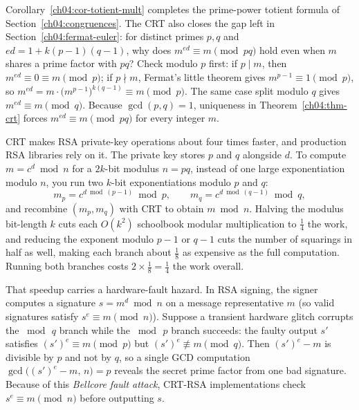 Corollary~\ref{ch04:cor-totient-mult} completes the prime-power totient formula of
Section~\ref{ch04:congruences}. The CRT also closes the gap left in Section~\ref{ch04:fermat-euler}:
for distinct primes $p, q$ and $ed = 1 + k(p-1)(q-1)$, why does $m^{ed} \equiv m \pmod{pq}$ hold even
when $m$ shares a prime factor with $pq$? Check modulo $p$ first: if $p \mid m$, then
$m^{ed} \equiv 0 \equiv m \pmod p$; if $p \nmid m$, Fermat's little theorem gives
$m^{p-1} \equiv 1 \pmod p$, so $m^{ed} = m \cdot \bigl(m^{p-1}\bigr)^{k(q-1)} \equiv m \pmod p$. The
same case split modulo $q$ gives $m^{ed} \equiv m \pmod q$. Because $\gcd(p, q) = 1$, uniqueness in
Theorem~\ref{ch04:thm-crt} forces $m^{ed} \equiv m \pmod{pq}$ for every integer $m$.

\begin{applicationbox}
CRT makes RSA private-key operations about four times faster, and production RSA libraries rely on
it. The private key stores $p$ and $q$ alongside $d$. To compute $m = c^d \bmod n$ for a $2k$-bit
modulus $n = pq$, instead of one large exponentiation modulo $n$, you run two $k$-bit
exponentiations modulo $p$ and $q$:
\[
  m_p = c^{d \bmod (p-1)} \bmod p, \qquad m_q = c^{d \bmod (q-1)} \bmod q,
\]
and recombine $(m_p, m_q)$ with CRT to obtain $m \bmod n$. Halving the modulus bit-length $k$ cuts
each $O(k^2)$ schoolbook modular multiplication to $\tfrac{1}{4}$ the work, and reducing the
exponent modulo $p - 1$ or $q - 1$ cuts the number of squarings in half as well, making each branch
about $\tfrac{1}{8}$ as expensive as the full computation. Running both branches costs
$2 \times \tfrac{1}{8} = \tfrac{1}{4}$ the work overall.

That speedup carries a hardware-fault hazard. In RSA signing, the signer computes a signature
$s = m^d \bmod n$ on a message representative $m$ (so valid signatures satisfy
$s^e \equiv m \pmod n$). Suppose a transient hardware glitch corrupts the $\bmod\,q$ branch while the
$\bmod\,p$ branch succeeds: the faulty output $s'$ satisfies $(s')^e \equiv m \pmod p$ but
$(s')^e \not\equiv m \pmod q$. Then $(s')^e - m$ is divisible by $p$ and not by $q$, so a single GCD
computation $\gcd\bigl((s')^e - m,\, n\bigr) = p$ reveals the secret prime factor from one bad
signature. Because of this \emph{Bellcore fault attack}, CRT-RSA implementations check
$s^e \equiv m \pmod n$ before outputting $s$.
\end{applicationbox}

